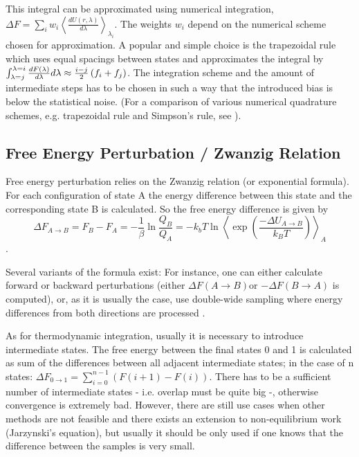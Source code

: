 This integral can be approximated using numerical integration, $\Delta F=\sum_{i}w_{i}\left\langle \frac{dU\left(r,\lambda\right)}{d\lambda}\right\rangle _{\lambda_{i}}$.
The weights $w_{i}$ depend on the numerical scheme chosen for approximation.
A popular and simple choice is the trapezoidal rule which uses equal
spacings between states and approximates the integral by $\intop_{\lambda=j}^{\lambda=i}\frac{dF\left(\lambda\right)}{d\lambda}d\lambda\approx\frac{i-j}{2}\left(f_{i}+f_{j}\right)$.
The integration scheme and the amount of intermediate steps has to
be chosen in such a way that the introduced bias is below the statistical
noise\cite{Shirts.2013}. (For a comparison of various numerical quadrature
schemes, e.g. trapezoidal rule and Simpson's rule, see \cite{Bruckner.2011b}). 

\subsection{Free Energy Perturbation / Zwanzig Relation}

Free energy perturbation relies on the Zwanzig relation (or exponential
formula). For each configuration of state A the energy difference
between this state and the corresponding state B is calculated. So the
free energy difference is given by 
\[
\Delta F_{A\rightarrow B}=F_{B}-F_{A}=-\frac{1}{\beta}\ln\frac{Q_{B}}{Q_{A}}=-k_{b}T\ln\left\langle \exp\left(\frac{-\Delta U_{A\rightarrow B}}{k_{B}T}\right)\right\rangle _{A}
\]\cite{Gapsys.2015}. 

Several variants of the formula exist: For instance, one can either
calculate forward or backward perturbations (either $\Delta F\left(A\rightarrow B\right)$or
$-\Delta F\left(B\rightarrow A\right)$ is computed), or, as it is
usually the case, use double-wide sampling where energy differences
from both directions are processed \cite{Bruckner.2011}.

As for thermodynamic integration, usually it is necessary to
introduce intermediate states. The free energy between the final states
0 and 1 is calculated as sum of the differences between all adjacent
intermediate states; in the case of n states: $\Delta F_{0\rightarrow1}=\sum_{i=0}^{n-1}\left(F\left(i+1\right)-F\left(i\right)\right)$.
There has to be a sufficient number of intermediate states - i.e.
overlap must be quite big -, otherwise convergence is extremely bad.
However, there are still use cases when other methods are not feasible\cite{Boresch.2017}
and there exists an extension to non-equilibrium work (Jarzynski's
equation)\cite{Boresch.2017}, but usually it should be only used
if one knows that the difference between the samples is very small\cite{Shirts.2013}.

